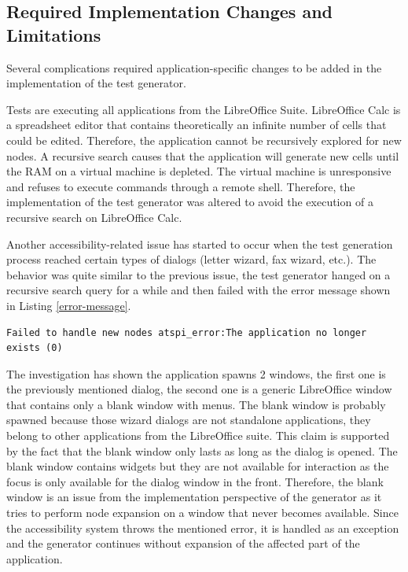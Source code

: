 \subsection{Required Implementation Changes and Limitations}
Several complications required application-specific changes to be added in the implementation of the test generator. 

Tests are executing all applications from the LibreOffice Suite. LibreOffice Calc is a spreadsheet editor that contains theoretically an infinite number of cells that could be edited. Therefore, the application cannot be recursively explored for new nodes. A recursive search causes that the application will generate new cells until the RAM on a virtual machine is depleted. The virtual machine is unresponsive and refuses to execute commands through a remote shell. Therefore, the implementation of the test generator was altered to avoid the execution of a recursive search on LibreOffice Calc.

Another accessibility-related issue has started to occur when the test generation process reached certain types of dialogs (letter wizard, fax wizard, etc.). The behavior was quite similar to the previous issue, the test generator hanged on a recursive search query for a while and then failed with the error message shown in Listing \ref{error-message}.

\begin{lstlisting}[caption={The error that prevents the generator from node expansion},label={error-message}]
Failed to handle new nodes atspi_error:The application no longer exists (0)
\end{lstlisting}

 The investigation has shown the application spawns 2 windows, the first one is the previously mentioned dialog, the second one is a generic LibreOffice window that contains only a blank window with menus. The blank window is probably spawned because those wizard dialogs are not standalone applications, they belong to other applications from the LibreOffice suite. This claim is supported by the fact that the blank window only lasts as long as the dialog is opened. The blank window contains widgets but they are not available for interaction as the focus is only available for the dialog window in the front. Therefore, the blank window is an issue from the implementation perspective of the generator as it tries to perform node expansion on a window that never becomes available. Since the accessibility system throws the mentioned error, it is handled as an exception and the generator continues without expansion of the affected part of the application.

